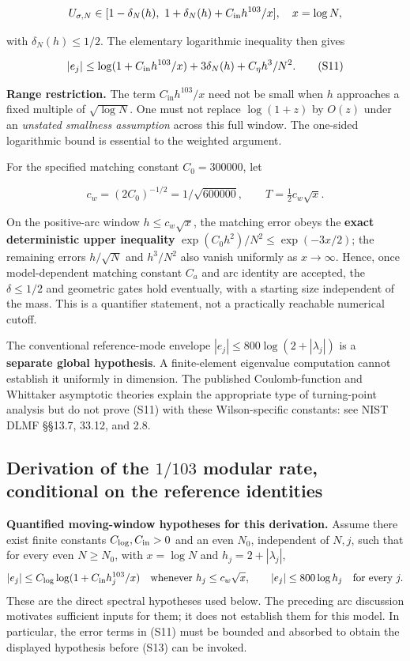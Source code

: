 \documentclass[
  10pt,
  a4paper,
]{article}
\begin{document}
\[
U_{\sigma,N}\in[1-\delta_N(h),\ 1+\delta_N(h)+C_{\rm in}h^{103}/x],
\quad x=\log N,
\]

with \(\delta_N(h)\le 1/2\). The elementary logarithmic inequality then gives

\[
|e_j|\le \log(1+C_{\rm in}h^{103}/x)+3\delta_N(h)+C_\eta h^3/N^2.
\tag{S11}
\]

\textbf{Range restriction.} The term \(C_{\mathrm{in}} h^{103}/x\) need not be small when \(h\) approaches a fixed multiple of \(\sqrt{\log N}\). One must not replace \(\log(1+z)\) by \(O(z)\) under an \emph{unstated smallness assumption} across this full window. The one-sided logarithmic bound is essential to the weighted argument.

For the specified matching constant \(C_0=300000\), let

\[
c_w=(2C_0)^{-1/2}=1/\sqrt{600000},\qquad
 T=\tfrac12c_w\sqrt x.
\]

On the positive-arc window \(h\le c_w \sqrt{x}\), the matching error obeys the \textbf{exact deterministic upper inequality} \(\exp(C_0 h^2)/N^2 \le \exp(-3x/2)\); the remaining errors \(h/\sqrt{N}\) and \(h^3/N^2\) also vanish uniformly as \(x\to\infty\). Hence, once model-dependent matching constant \(C_a\) and arc identity are accepted, the \(\delta\le 1/2\) and geometric gates hold eventually, with a starting size independent of the mass. This is a quantifier statement, not a practically reachable numerical cutoff.

The conventional reference-mode envelope \(|e_j|\le 800 \log(2+|\lambda_j|)\) is a \textbf{separate global hypothesis}. A finite-element eigenvalue computation cannot establish it uniformly in dimension. The published Coulomb-function and Whittaker asymptotic theories explain the appropriate type of turning-point analysis but do not prove (S11) with these Wilson-specific constants: see NIST DLMF §§13.7, 33.12, and 2.8.

\subsection{\texorpdfstring{Derivation of the \(1/103\) modular rate, conditional on the reference identities}{Derivation of the 1/103 modular rate, conditional on the reference identities}}\label{derivation-of-the-1103-modular-rate-conditional-on-the-reference-identities}

\textbf{Quantified moving-window hypotheses for this derivation.} Assume there exist finite constants \(C_{\log},C_{\rm in}>0\) and an even \(N_0\), independent of \(N,j\), such that for every even \(N\ge N_0\), with \(x=\log N\) and \(h_j=2+|\lambda_j|\), \[
|e_j|\le C_{\log}\log(1+C_{\rm in}h_j^{103}/x)
\quad\text{whenever }h_j\le c_w\sqrt{x},
\qquad |e_j|\le800\log h_j\quad\text{for every }j.
\] These are the direct spectral hypotheses used below. The preceding arc discussion motivates sufficient inputs for them; it does not establish them for this model. In particular, the error terms in (S11) must be bounded and absorbed to obtain the displayed hypothesis before (S13) can be invoked.
\end{document}
